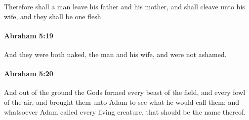 			Therefore shall a man leave his father and his mother, and shall cleave unto his wife, and they shall be one flesh.


		\paragraph{Abraham 5:19} %
			\label{ABRAHAM-5-19}

			And they were both naked, the man and his wife, and were not ashamed.


		\paragraph{Abraham 5:20} %
			\label{ABRAHAM-5-20}

			And out of the ground the Gods formed every beast of the field, and every fowl of the air, and brought them unto Adam to see what he would call them; and whatsoever Adam called every living creature, that should be the name thereof.

